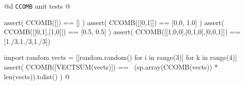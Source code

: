 \documentclass[11pt,oneside]{article}	%
\begin{document}
@d \texttt{CCOMB} unit tests
@{assert( CCOMB([]) == [] )
assert( CCOMB([[0,1]]) == [0.0, 1.0] )
assert( CCOMB([[0,1],[1,0]]) == [0.5, 0.5] )
assert( CCOMB([[1,0,0],[0,1,0],[0,0,1]]) == [1./3,1./3,1./3])

import random
vects = [[random.random() for i in range(3)] for k in range(4)]
assert( CCOMB([VECTSUM(vects)]) == \
        (sp.array(CCOMB(vects)) * len(vects)).tolist() )
@}



\end{document}
